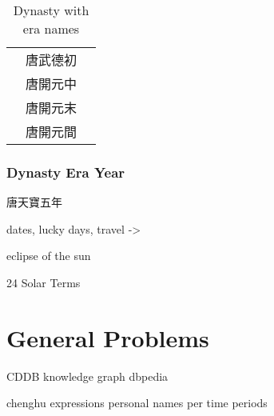 \documentclass[12pt, draft]{article}
\begin{document}
{\footnotesize
\begin{table}[h]
\caption{Dynasty with era names}
\begin{tabular}{lll}
 & 唐武德初 & \\
 & 唐開元中 & \\
 & 唐開元末 & \\
 & 唐開元間 & \\
\end{tabular}
\end{table}
}

\subsubsection{Dynasty Era Year}

唐天寶五年

dates, lucky days, travel ->

eclipse of the sun

24 Solar Terms

\section{General Problems}
CDDB
knowledge graph
dbpedia


chenghu expressions
personal names per time periods
\end{document}
